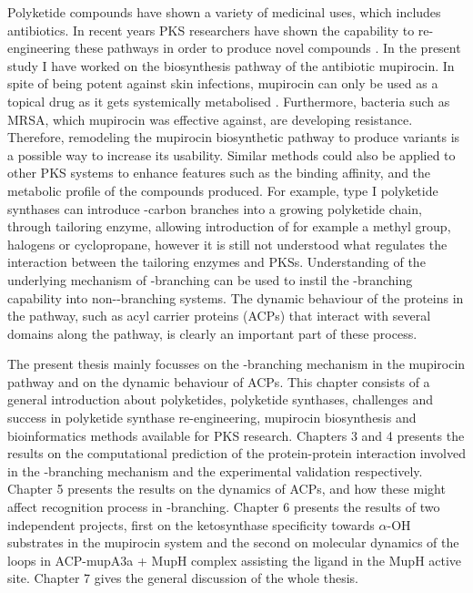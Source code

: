 Polyketide compounds have shown a variety of medicinal uses, which includes antibiotics. In recent years PKS researchers have shown the capability to re-engineering these pathways in order to produce novel compounds \parencite{Kapur2012, Sugimoto2014}. In the present study I have worked on the biosynthesis pathway of the antibiotic mupirocin. In spite of being potent against skin infections, mupirocin can only be used as a topical drug as it gets systemically metabolised \parencite{Parenti1987}. Furthermore, bacteria such as MRSA, which mupirocin was effective against, are developing resistance. Therefore, remodeling the mupirocin biosynthetic pathway to produce variants is a possible way to increase its usability. Similar methods could also be applied to other PKS systems to enhance features such as the binding affinity, and the metabolic profile of the compounds produced. For example, type I polyketide synthases can introduce \bet-carbon branches into a growing polyketide chain, through tailoring enzyme, allowing introduction of for example a methyl group, halogens or cyclopropane, however it is still not understood what regulates the interaction between the tailoring enzymes and PKSs. Understanding of the underlying mechanism of \bet-branching can be used to instil the \bet-branching capability into non-\bet-branching systems. The dynamic behaviour of the proteins in the pathway, such as acyl carrier proteins (ACPs) that interact with several domains along the pathway, is clearly an important part of these process. 

The present thesis mainly focusses on the \bet-branching mechanism in the mupirocin pathway and on the dynamic behaviour of ACPs. This chapter consists of a general introduction about polyketides, polyketide synthases, challenges and success in polyketide synthase re-engineering, mupirocin biosynthesis and bioinformatics methods available for PKS research. Chapters 3 and 4 presents the results on the computational prediction of the protein-protein interaction involved in the \bet-branching mechanism and the experimental validation respectively. Chapter 5 presents the results on the dynamics of ACPs, and how these might affect recognition process in \bet-branching. Chapter 6 presents the results of two independent projects, first on the ketosynthase specificity towards $ \alpha $-OH substrates in the mupirocin system and the second on molecular dynamics of the loops in ACP-mupA3a + MupH complex assisting the ligand in the MupH active site. Chapter 7 gives the general discussion of the whole thesis. 

